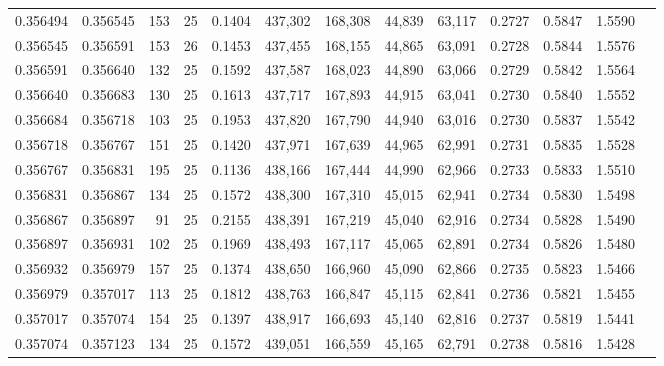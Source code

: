 \begin{tabular}{rrrrrrrrrrrrr}
0.356494 & 0.356545 &   153 &  25 &                                     0.1404 & 437,302 & 168,308 &  44,839 &  63,117 & 0.2727 & 0.5847 & 1.5590 \\
0.356545 & 0.356591 &   153 &  26 &                                     0.1453 & 437,455 & 168,155 &  44,865 &  63,091 & 0.2728 & 0.5844 & 1.5576 \\
0.356591 & 0.356640 &   132 &  25 &                                     0.1592 & 437,587 & 168,023 &  44,890 &  63,066 & 0.2729 & 0.5842 & 1.5564 \\
0.356640 & 0.356683 &   130 &  25 &                                     0.1613 & 437,717 & 167,893 &  44,915 &  63,041 & 0.2730 & 0.5840 & 1.5552 \\
0.356684 & 0.356718 &   103 &  25 &                                     0.1953 & 437,820 & 167,790 &  44,940 &  63,016 & 0.2730 & 0.5837 & 1.5542 \\
0.356718 & 0.356767 &   151 &  25 &                                     0.1420 & 437,971 & 167,639 &  44,965 &  62,991 & 0.2731 & 0.5835 & 1.5528 \\
0.356767 & 0.356831 &   195 &  25 &                                     0.1136 & 438,166 & 167,444 &  44,990 &  62,966 & 0.2733 & 0.5833 & 1.5510 \\
0.356831 & 0.356867 &   134 &  25 &                                     0.1572 & 438,300 & 167,310 &  45,015 &  62,941 & 0.2734 & 0.5830 & 1.5498 \\
0.356867 & 0.356897 &    91 &  25 &                                     0.2155 & 438,391 & 167,219 &  45,040 &  62,916 & 0.2734 & 0.5828 & 1.5490 \\
0.356897 & 0.356931 &   102 &  25 &                                     0.1969 & 438,493 & 167,117 &  45,065 &  62,891 & 0.2734 & 0.5826 & 1.5480 \\
0.356932 & 0.356979 &   157 &  25 &                                     0.1374 & 438,650 & 166,960 &  45,090 &  62,866 & 0.2735 & 0.5823 & 1.5466 \\
0.356979 & 0.357017 &   113 &  25 &                                     0.1812 & 438,763 & 166,847 &  45,115 &  62,841 & 0.2736 & 0.5821 & 1.5455 \\
0.357017 & 0.357074 &   154 &  25 &                                     0.1397 & 438,917 & 166,693 &  45,140 &  62,816 & 0.2737 & 0.5819 & 1.5441 \\
0.357074 & 0.357123 &   134 &  25 &                                     0.1572 & 439,051 & 166,559 &  45,165 &  62,791 & 0.2738 & 0.5816 & 1.5428 \\

\end{tabular}

